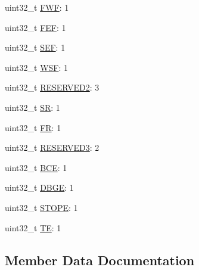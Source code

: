 \begin{DoxyCompactItemize}
uint32\+\_\+t \hyperlink{struct__hw__i2s__tcsr_1_1__hw__i2s__tcsr__bitfields_adf64d4a40309e8ce45ce9f4f9acb78b3}{F\+WF}\+: 1
\item 
uint32\+\_\+t \hyperlink{struct__hw__i2s__tcsr_1_1__hw__i2s__tcsr__bitfields_a46180a7e6673fa104244f2b2d48c5c18}{F\+EF}\+: 1
\item 
uint32\+\_\+t \hyperlink{struct__hw__i2s__tcsr_1_1__hw__i2s__tcsr__bitfields_aadbcffff2485198077d082c7c7966ef1}{S\+EF}\+: 1
\item 
uint32\+\_\+t \hyperlink{struct__hw__i2s__tcsr_1_1__hw__i2s__tcsr__bitfields_a59fc16b1ed7b651100e10c38b7895789}{W\+SF}\+: 1
\item 
uint32\+\_\+t \hyperlink{struct__hw__i2s__tcsr_1_1__hw__i2s__tcsr__bitfields_a114a84b5b849ac0bccda373fa48f8386}{R\+E\+S\+E\+R\+V\+E\+D2}\+: 3
\item 
uint32\+\_\+t \hyperlink{struct__hw__i2s__tcsr_1_1__hw__i2s__tcsr__bitfields_aa98f2ecc35963422e32755bc2aae91d8}{SR}\+: 1
\item 
uint32\+\_\+t \hyperlink{struct__hw__i2s__tcsr_1_1__hw__i2s__tcsr__bitfields_acfcbd352890e181a654c01b40d4ee5af}{FR}\+: 1
\item 
uint32\+\_\+t \hyperlink{struct__hw__i2s__tcsr_1_1__hw__i2s__tcsr__bitfields_ae9ec8c970a6bf88637f38ea01b695950}{R\+E\+S\+E\+R\+V\+E\+D3}\+: 2
\item 
uint32\+\_\+t \hyperlink{struct__hw__i2s__tcsr_1_1__hw__i2s__tcsr__bitfields_a0000b6eca3ea1bc65a761c155e6c0daf}{B\+CE}\+: 1
\item 
uint32\+\_\+t \hyperlink{struct__hw__i2s__tcsr_1_1__hw__i2s__tcsr__bitfields_a7045ec01e1edd83c89cfdfbb87434690}{D\+B\+GE}\+: 1
\item 
uint32\+\_\+t \hyperlink{struct__hw__i2s__tcsr_1_1__hw__i2s__tcsr__bitfields_ad5494d3c91c6a8b5de076a56b0ebb362}{S\+T\+O\+PE}\+: 1
\item 
uint32\+\_\+t \hyperlink{struct__hw__i2s__tcsr_1_1__hw__i2s__tcsr__bitfields_aec908a7d340dca5a6e00095d2d9f83b4}{TE}\+: 1
\end{DoxyCompactItemize}


\subsection{Member Data Documentation}
